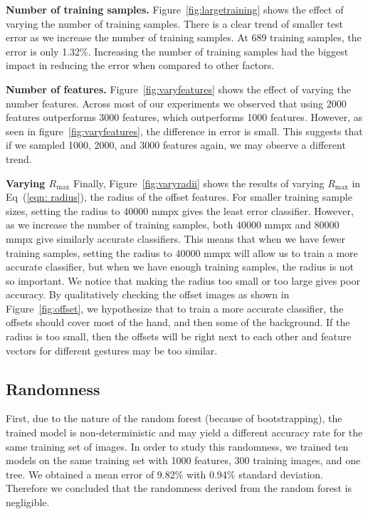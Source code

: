 \textbf{Number of training samples.} Figure~\ref{fig:largetraining} shows the effect of varying the number of training samples. There is a clear trend of smaller test error as we increase the number of training samples. At 689 training samples, the error is only 1.32\%. Increasing the number of training samples had the biggest impact in reducing the error when compared to other factors. 

\textbf{Number of features.} Figure~\ref{fig:varyfeatures} shows the effect of varying the number features. Across most of our experiments we observed that using 2000 features outperforms 3000 features, which outperforms 1000 features. However, as seen in figure~\ref{fig:varyfeatures}, the difference in error is small. This suggests that if we sampled 1000, 2000, and 3000 features again, we may observe a different trend.

\textbf{Varying $R_{\text{max}}$}
Finally, Figure~\ref{fig:varyradii} shows the results of varying $R_{\text{max}}$ in Eq~(\ref{eqn: radius}), the radius of the offset features. For smaller training sample sizes, setting the radius to 40000 mmpx gives the least error classifier. However, as we increase the number of training samples, both 40000 mmpx and 80000 mmpx give similarly accurate classifiers. This means that when we have fewer training samples, setting the radius to 40000 mmpx will allow us to train a more accurate classifier, but when we have enough training samples, the radius is not so important. We notice that making the radius too small or too large gives poor accuracy. By qualitatively checking the offset images as shown in Figure~\ref{fig:offset}, we hypothesize that to train a more accurate classifier, the offsets should cover most of the hand, and then some of the background. If the radius is too small, then the offsets will be right next to each other and feature vectors for different gestures may be too similar.

\subsection{ Randomness }
First, due to the nature of the random forest (because of bootstrapping), the trained model is non-deterministic and may yield a different accuracy rate for the same training set of images. In order to study this randomness, we trained ten models on the same training set with 1000 features, 300 training images, and one tree. We obtained a mean error of 9.82\% with 0.94\% standard deviation. Therefore we concluded that the randomness derived from the random forest is negligible. 

